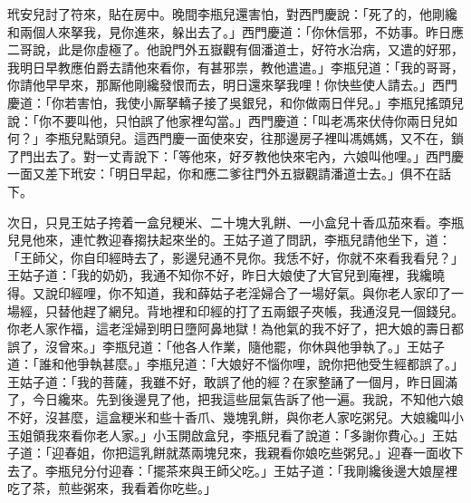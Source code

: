 玳安兒討了符來，貼在房中。晚間李瓶兒還害怕，對西門慶說：「死了的，他剛纔和兩個人來拏我，見你進來，躲出去了。」西門慶道：「你休信邪，不妨事。昨日應二哥說，此是你虛極了。他說門外五嶽觀有個潘道士，好符水治病，又遣的好邪，我明日早教應伯爵去請他來看你，有甚邪祟，教他遣遣。」李瓶兒道：「我的哥哥，你請他早早來，那厮他剛纔發恨而去，明日還來拏我哩！你快些使人請去。」西門慶道：「你若害怕，我使小厮拏轎子接了吳銀兒，和你做兩日伴兒。」李瓶兒搖頭兒說：「你不要叫他，只怕誤了他家裡勾當。」西門慶道：「叫老馮來伏侍你兩日兒如何？」李瓶兒點頭兒。這西門慶一面使來安，往那邊房子裡叫馮媽媽，又不在，鎖了門出去了。對一丈青說下：「等他來，好歹教他快來宅內，六娘叫他哩。」西門慶一面又差下玳安：「明日早起，你和應二爹往門外五嶽觀請潘道士去。」俱不在話下。

次日，只見王姑子挎着一盒兒粳米、二十塊大乳餅、一小盒兒十香瓜茄來看。李瓶兒見他來，連忙教迎春搊扶起來坐的。王姑子道了問訊，李瓶兒請他坐下，道：「王師父，你自印經時去了，影邊兒通不見你。我恁不好，你就不來看我看兒？」王姑子道：「我的奶奶，我通不知你不好，昨日大娘使了大官兒到庵裡，我纔曉得。又說印經哩，你不知道，我和薛姑子老淫婦合了一場好氣。與你老人家印了一場經，只替他趕了網兒。背地裡和印經的打了五兩銀子夾帳，我通沒見一個錢兒。你老人家作福，這老淫婦到明日墮阿鼻地獄！{}為他氣的我不好了，把大娘的壽日都誤了，沒曾來。」李瓶兒道：「他各人作業，隨他罷，你休與他爭執了。」王姑子道：「誰和他爭執甚麼。」李瓶兒道：「大娘好不惱你哩，說你把他受生經都誤了。」王姑子道：「我的菩薩，我雖不好，敢誤了他的經？在家整誦了一個月，昨日圓滿了，今日纔來。先到後邊見了他，把我這些屈氣告訴了他一遍。我說，不知他六娘不好，沒甚麼，這盒粳米和些十香爪、幾塊乳餅，與你老人家吃粥兒。大娘纔叫小玉姐領我來看你老人家。」小玉開啟盒兒，李瓶兒看了說道：「多謝你費心。」王姑子道：「迎春姐，你把這乳餅就蒸兩塊兒來，我親看你娘吃些粥兒。」迎春一面收下去了。李瓶兒分付迎春：「擺茶來與王師父吃。」王姑子道：「我剛纔後邊大娘屋裡吃了茶，煎些粥來，我看着你吃些。」

